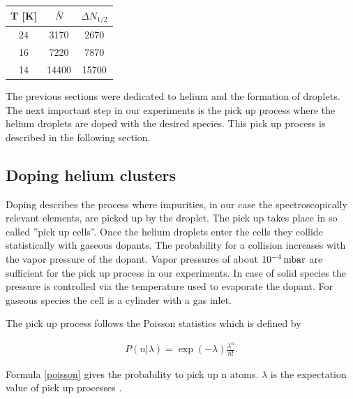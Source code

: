 \documentclass[parskip,12pt,headsepline,a4paper] {scrbook}
\begin{document}
\begin{table}[h]
{}
\label{cluster-values}
\begin{center}
\begin{tabular}{c|c|c}

 T [K] & $\bar{N}$ & $\Delta N_{1/2}$ \\

\hline
\rowcolor{hellgrau}
24 & 3170 & 2670 \\
\rowcolor{dunkelgrau}
16 & 7220 & 7870  \\
\rowcolor{hellgrau}
14 & 14400 & 15700  \\
\end{tabular}
\end{center}
\end{table}

The previous sections were dedicated to helium and the formation of droplets. The next important step in our experiments is the pick up process where the helium droplets are doped with the desired species. This pick up process is described in the following section.

\subsection{Doping helium clusters}
\vspace{-1\baselineskip}
Doping describes the process where impurities, in our case the spectroscopically relevant elements, are picked up by the droplet. The pick up takes place in so called ''pick up cells''. Once the helium droplets enter the cells they collide statistically with gaseous dopants. The probability for a collision increases with the vapor pressure of the dopant. Vapor pressures of about $\unit[10^{-4}]{mbar}$ are sufficient for the pick up process in our experiments. In case of solid species the pressure is controlled via the temperature used to evaporate the dopant. For gaseous species the cell is a cylinder with a gas inlet.

The pick up process follows the Poisson statistics which is defined by

\begin{align}  \label{poisson}
P(n|\lambda) = \exp(-\lambda) \frac{\lambda^n}{n!}.
\end{align}

Formula \ref{poisson} gives the probability to pick up n atoms. $\lambda$ is the expectation value of pick up processes \cite{vdl}.
\end{document}
